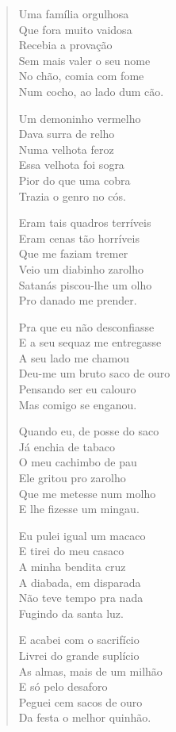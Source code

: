 \begin{verse}
Uma família orgulhosa\\
Que fora muito vaidosa\\
Recebia a provação\\
Sem mais valer o seu nome\\
No chão, comia com fome\\
Num cocho, ao lado dum cão. 

Um demoninho vermelho\\
Dava surra de relho \\
Numa velhota feroz\\
Essa velhota foi sogra\\
Pior do que uma cobra\\
Trazia o genro no cós.

Eram tais quadros terríveis\\
Eram cenas tão horríveis\\
Que me faziam tremer\\
Veio um diabinho zarolho\\
Satanás piscou-lhe um olho\\
Pro danado me prender.


Pra que eu não desconfiasse\\
E a seu sequaz me entregasse\\
A seu lado me chamou\\
Deu-me um bruto saco de ouro\\
Pensando ser eu calouro\\
Mas comigo se enganou.

Quando eu, de posse do saco\\
Já enchia de tabaco\\
O meu cachimbo de pau\\
Ele gritou pro zarolho\\
Que me metesse num molho\\
E lhe fizesse um mingau.

Eu pulei igual um macaco\\
E tirei do meu casaco\\
A minha bendita cruz\\
A diabada, em disparada\\
Não teve tempo pra nada\\
Fugindo da santa luz.

E acabei com o sacrifício\\
Livrei do grande suplício\\
As almas, mais de um milhão\\
E só pelo desaforo\\
Peguei cem sacos de ouro\\
Da festa o melhor quinhão.



\end{verse}

